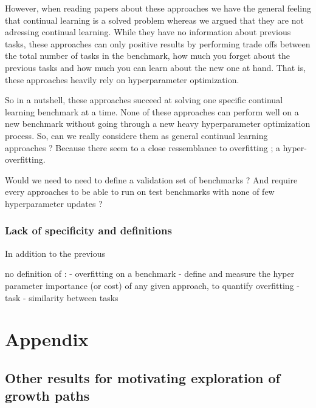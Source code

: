 \documentclass{article}
\begin{document}
However, when reading papers about these approaches we have the general feeling that continual learning is a solved problem whereas we argued that they are not adressing continual learning. While they have no information about previous tasks, these approaches can only positive results by performing trade offs between the total number of tasks in the benchmark, how much you forget about the previous tasks and how much you can learn about the new one at hand. That is, these approaches heavily rely on hyperparameter optimization.


So in a nutshell, these approaches succeed at solving one specific continual learning benchmark at a time. None of these approaches can perform well on a new benchmark without going through a new heavy hyperparameter optimization process. So, can we really considere them as general continual learning approaches ? Because there seem to a close ressemblance to overfitting ; a hyper-overfitting.

Would we need to need to define a validation set of benchmarks ? And require every approaches to be able to run on test benchmarks with none of few hyperparameter updates ?


\subsubsection{Lack of specificity and definitions}

In addition to the previous

no definition of :
- overfitting on a benchmark
    - define and measure the hyper parameter importance (or cost) of any given approach, to quantify overfitting
- task
- similarity between tasks



\nocite{*}
\printbibliography


\section*{Appendix}
\subsection{Other results for motivating exploration of growth paths}
\end{document}
